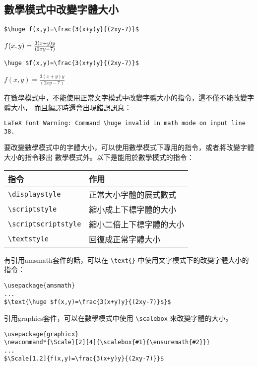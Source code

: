 \subsection{數學模式中改變字體大小}

\begin{Wrong}
\begin{verbatim}
$\huge f(x,y)=\frac{3(x+y)y}{(2xy-7)}$
\end{verbatim}
$\huge f(x,y)=\frac{3(x+y)y}{(2xy-7)}$
\end{Wrong}

\begin{Right}
\begin{verbatim}
\huge $f(x,y)=\frac{3(x+y)y}{(2xy-7)}$
\end{verbatim}
\huge $f(x,y)=\frac{3(x+y)y}{(2xy-7)}$
\end{Right}

在數學模式中，不能使用正常文字模式中改變字體大小的指令，這不僅不能改變字體大小，
而且編譯時還會出現錯誤訊息：

\begin{Code}
\small
\begin{verbatim}
LaTeX Font Warning: Command \huge invalid in math mode on input line 38.
\end{verbatim}
\end{Code}

要改變數學模式中的字體大小，可以使用數學模式下專用的指令，或者將改變字體大小的指令移出
數學模式外。以下是能用於數學模式的指令：

\vspace{.5\baselineskip}
\begin{center}
\small
{}
\begin{tabular}{ll}
\hline
指令 & 作用 \\
\hline
\verb|\displaystyle|      & 正常大小字體的展式數式 \\
\verb|\scriptstyle|       & 縮小成上下標字體的大小 \\
\verb|\scriptscriptstyle| & 縮小二倍上下標字體的大小 \\
\verb|\textstyle|         & 回復成正常字體大小 \\
\hline
\end{tabular}
\end{center}
\vspace{.5\baselineskip}

有引用{\sf amsmath}套件的話，可以在 \verb|\text{}| 中使用文字模式下的改變字體大小的指令：

\begin{Code}
\small
{}
\begin{verbatim}
\usepackage{amsmath}
...
$\text{\huge $f(x,y)=\frac{3(x+y)y}{(2xy-7)}$}$
\end{verbatim}
\end{Code}

引用{\sf graphics}套件，可以在數學模式中使用 \verb|\scalebox| 來改變字體的大小。

\begin{Code}
\small
{}
\begin{verbatim}
\usepackage{graphicx}
\newcommand*{\Scale}[2][4]{\scalebox{#1}{\ensuremath{#2}}}
...
$\Scale[1.2]{f(x,y)=\frac{3(x+y)y}{(2xy-7)}}$
\end{verbatim}
\end{Code}

\marginpar{\back}
